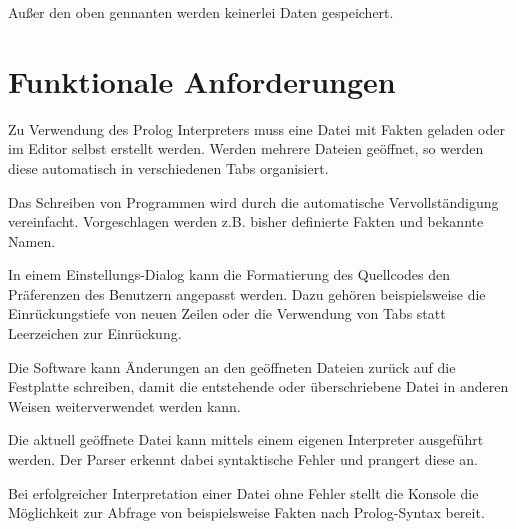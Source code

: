 \documentclass[parskip=full,11pt,twoside]{scrartcl}
\begin{document}
Außer den oben gennanten werden keinerlei Daten gespeichert.
\section{Funktionale Anforderungen}


Zu Verwendung des Prolog Interpreters muss eine Datei mit Fakten geladen oder im Editor selbst erstellt werden. Werden mehrere Dateien geöffnet, so werden diese automatisch in verschiedenen Tabs organisiert.


Das Schreiben von Programmen wird durch die automatische Vervollständigung vereinfacht. Vorgeschlagen werden z.B. bisher definierte Fakten und bekannte Namen.


In einem Einstellungs-Dialog kann die Formatierung des Quellcodes den Präferenzen des Benutzern angepasst werden. Dazu gehören beispielsweise die Einrückungstiefe von neuen Zeilen oder die Verwendung von Tabs statt Leerzeichen zur Einrückung.


Die Software kann Änderungen an den geöffneten Dateien zurück auf die Festplatte schreiben, damit die entstehende oder überschriebene Datei in anderen Weisen weiterverwendet werden kann.


Die aktuell geöffnete Datei kann mittels einem eigenen Interpreter ausgeführt werden. Der Parser erkennt dabei syntaktische Fehler und prangert diese an.


Bei erfolgreicher Interpretation einer Datei ohne Fehler stellt die Konsole die Möglichkeit zur Abfrage von beispielsweise Fakten nach Prolog-Syntax bereit.
\end{document}
